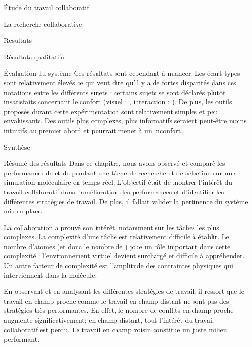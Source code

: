 \documentclass[myfrancais]{mythesis}
\begin{document}
\begin{mypart}{Étude du travail collaboratif}
\begin{mychapter}{La recherche collaborative}
\begin{mysection}{Résultats}
\begin{mysubsection}{Résultats qualitatifs}
\begin{mysubsubsection}{Évaluation du système}
						Ces résultats sont cependant à nuancer.
						Les écart-types sont relativement élevés ce qui veut dire qu'il y a de fortes disparités dans ces notations entre les différents sujets : certains sujets se sont déclarés plutôt insatisfaits concernant le confort (visuel : \mynum{2}, interaction : ).
						De plus, les outils proposés durant cette expérimentation sont relativement simples et peu envahissants.
						Des outils plus complexes, plus informatifs seraient peut-être moins intuitifs au premier abord et pourrait mener à un inconfort.
					\end{mysubsubsection}
				\end{mysubsection}
			\end{mysection}
			\begin{mysection}{Synthèse}
				\begin{mysubsection}{Résumé des résultats}
					Dans ce chapitre, nous avons observé et comparé les performances de  et de  pendant une tâche de recherche et de sélection sur une simulation moléculaire en temps-réel.
					L'objectif était de montrer l'intérêt du travail collaboratif dans l'amélioration des performances et d'identifier les différentes stratégies de travail.
					De plus, il fallait valider la pertinence du système mis en place.

					La collaboration a prouvé son intérêt, notamment sur les tâches les plus complexes.
					La complexité d'une tâche est relativement difficile à établir.
					Le nombre d'atomes (et donc le nombre de ) joue un rôle important dans cette complexité : l'environnement virtuel devient surchargé et difficile à appréhender.
					Un autre facteur de complexité est l'amplitude des contraintes physiques qui interviennent dans la molécule.

					En observant et en analysant les différentes stratégies de travail, il ressort que le travail en champ proche comme le travail en champ distant ne sont pas des stratégies très performantes.
					En effet, le nombre de conflits en champ proche augmente significativement; en champ distant, tout l'intérêt du travail collaboratif est perdu.
					Le travail en champ voisin constitue un juste milieu performant.


\end{mysubsection}
\end{mysection}
\end{mychapter}
\end{mypart}
\end{document}
